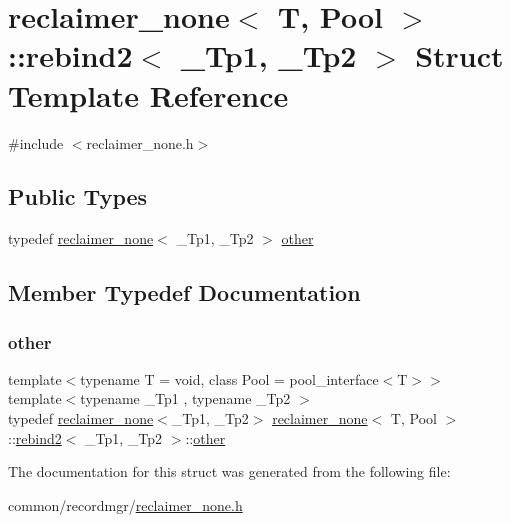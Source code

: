 \hypertarget{structreclaimer__none_1_1rebind2}{}\section{reclaimer\+\_\+none$<$ T, Pool $>$\+:\+:rebind2$<$ \+\_\+\+Tp1, \+\_\+\+Tp2 $>$ Struct Template Reference}
\label{structreclaimer__none_1_1rebind2}


{\ttfamily \#include $<$reclaimer\+\_\+none.\+h$>$}

\subsection*{Public Types}
\begin{DoxyCompactItemize}
\item 
typedef \hyperlink{classreclaimer__none}{reclaimer\+\_\+none}$<$ \+\_\+\+Tp1, \+\_\+\+Tp2 $>$ \hyperlink{structreclaimer__none_1_1rebind2_a99b1ffb738e57b8f796516faceab20be}{other}
\end{DoxyCompactItemize}


\subsection{Member Typedef Documentation}
\mbox{\label{structreclaimer__none_1_1rebind2_a99b1ffb738e57b8f796516faceab20be}} 
\subsubsection{\texorpdfstring{other}{other}}
{\footnotesize\ttfamily template$<$typename T  = void, class Pool  = pool\+\_\+interface$<$\+T$>$$>$ \\
template$<$typename \+\_\+\+Tp1 , typename \+\_\+\+Tp2 $>$ \\
typedef \hyperlink{classreclaimer__none}{reclaimer\+\_\+none}$<$\+\_\+\+Tp1, \+\_\+\+Tp2$>$ \hyperlink{classreclaimer__none}{reclaimer\+\_\+none}$<$ T, Pool $>$\+::\hyperlink{structreclaimer__none_1_1rebind2}{rebind2}$<$ \+\_\+\+Tp1, \+\_\+\+Tp2 $>$\+::\hyperlink{structreclaimer__none_1_1rebind2_a99b1ffb738e57b8f796516faceab20be}{other}}



The documentation for this struct was generated from the following file\+:\begin{DoxyCompactItemize}
\item 
common/recordmgr/\hyperlink{reclaimer__none_8h}{reclaimer\+\_\+none.\+h}\end{DoxyCompactItemize}

